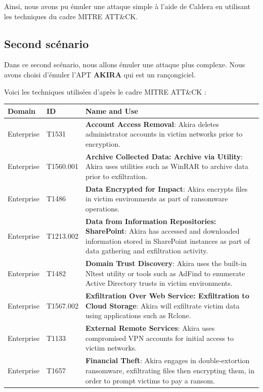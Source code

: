 \documentclass[12pt,letterpaper]{article}
\begin{document}
Ainsi, nous avons pu émuler une attaque simple à l'aide de Caldera en utilisant les techniques du cadre MITRE ATT\&CK.

\newpage
\subsection{Second scénario}

Dans ce second scénario, nous allons émuler une attaque plus complexe.
Nous avons choisi d'émuler l'APT \textbf{AKIRA} qui est un rançongiciel.

Voici les techniques utilisées d'après le cadre MITRE ATT\&CK \cite{AkiraGOLDSAHARA} :
\begin{table}[h!]
    \centering
    \begin{tabular}{|l|l|p{10cm}|}
        \hline
        \textbf{Domain} & \textbf{ID} & \textbf{Name and Use} \\ \hline
        Enterprise & T1531 & \textbf{Account Access Removal}: Akira deletes administrator accounts in victim networks prior to encryption. \\ \hline
        Enterprise & T1560.001 & \textbf{Archive Collected Data: Archive via Utility}: Akira uses utilities such as WinRAR to archive data prior to exfiltration. \\ \hline
        Enterprise & T1486 & \textbf{Data Encrypted for Impact}: Akira encrypts files in victim environments as part of ransomware operations. \\ \hline
        Enterprise & T1213.002 & \textbf{Data from Information Repositories: SharePoint}: Akira has accessed and downloaded information stored in SharePoint instances as part of data gathering and exfiltration activity. \\ \hline
        Enterprise & T1482 & \textbf{Domain Trust Discovery}: Akira uses the built-in Nltest utility or tools such as AdFind to enumerate Active Directory trusts in victim environments. \\ \hline
        Enterprise & T1567.002 & \textbf{Exfiltration Over Web Service: Exfiltration to Cloud Storage}: Akira will exfiltrate victim data using applications such as Rclone. \\ \hline
        Enterprise & T1133 & \textbf{External Remote Services}: Akira uses compromised VPN accounts for initial access to victim networks. \\ \hline
        Enterprise & T1657 & \textbf{Financial Theft}: Akira engages in double-extortion ransomware, exfiltrating files then encrypting them, in order to prompt victims to pay a ransom. \\ \hline

\end{tabular}
\end{table}
\end{document}
